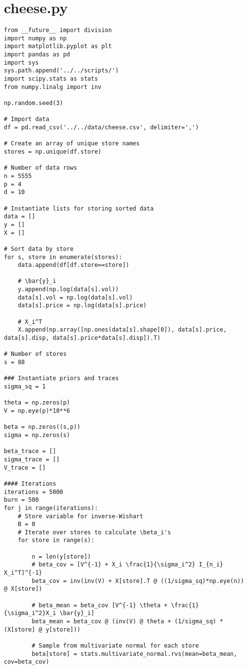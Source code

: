 \documentclass[11pt]{article}
\begin{document}
    \section*{cheese.py}
    \begin{lstlisting}
from __future__ import division
import numpy as np 
import matplotlib.pyplot as plt
import pandas as pd
import sys
sys.path.append('../../scripts/')
import scipy.stats as stats
from numpy.linalg import inv

np.random.seed(3)

# Import data
df = pd.read_csv('../../data/cheese.csv', delimiter=',')

# Create an array of unique store names
stores = np.unique(df.store)

# Number of data rows
n = 5555
p = 4
d = 10

# Instantiate lists for storing sorted data
data = []
y = []
X = []

# Sort data by store
for s, store in enumerate(stores):
    data.append(df[df.store==store])

    # \bar{y}_i
    y.append(np.log(data[s].vol))
    data[s].vol = np.log(data[s].vol)
    data[s].price = np.log(data[s].price)

    # X_i^T
    X.append(np.array([np.ones(data[s].shape[0]), data[s].price, data[s].disp, data[s].price*data[s].disp]).T)

# Number of stores
s = 88

### Instantiate priors and traces
sigma_sq = 1

theta = np.zeros(p)
V = np.eye(p)*10**6

beta = np.zeros((s,p))
sigma = np.zeros(s)

beta_trace = []
sigma_trace = []
V_trace = []

#### Iterations
iterations = 5000
burn = 500
for j in range(iterations):
    # Store variable for inverse-Wishart
    B = 0
    # Iterate over stores to calculate \beta_i's
    for store in range(s):

        n = len(y[store])
        # beta_cov = [V^{-1} + X_i \frac{1}{\sigma_i^2} I_{n_i} X_i^T]^{-1}
        beta_cov = inv(inv(V) + X[store].T @ ((1/sigma_sq)*np.eye(n)) @ X[store])

        # beta_mean = beta_cov [V^{-1} \theta + \frac{1}{\sigma_i^2}X_i \bar{y}_i]
        beta_mean = beta_cov @ (inv(V) @ theta + (1/sigma_sq) * (X[store] @ y[store]))

        # Sample from multivariate normal for each store
        beta[store] = stats.multivariate_normal.rvs(mean=beta_mean, cov=beta_cov)


\end{lstlisting}
\end{document}
